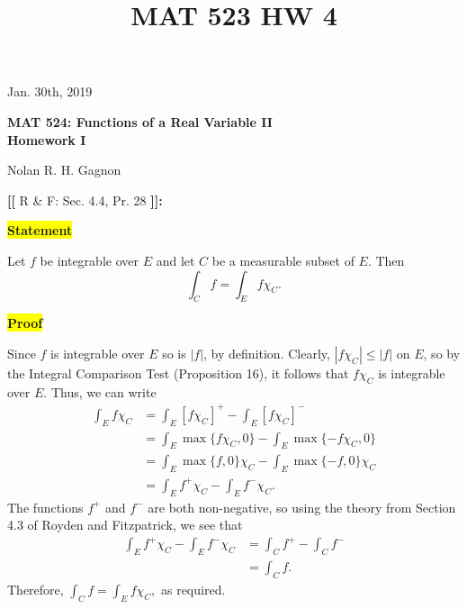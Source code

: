 \documentclass[12pt]{article}
\title{MAT 523 HW 4}
\newcommand{\mybox}{%
    \collectbox{%
        \setlength{\fboxsep}{2pt}%
        \fbox{\BOXCONTENT}%
    }%
}
\begin{document}
\hfill Jan. 30th, 2019
\begin{center}
\begin{large}
\textbf{MAT 524: Functions of a Real Variable II \\
\vspace{-5mm}
Homework I \\}
\end{large}
\vspace{-2mm}
Nolan R. H. Gagnon \\
\end{center}

\noindent \textbf{{\huge [}{\Large [}} R \& F: Sec. 4.4, Pr. 28 \textbf{{\Large ]}{\huge ]}}{\Large \textbf{:}}

\vspace{3mm}

\noindent\mybox{\colorbox{yellow}{\textbf{Statement}}}\hspace{3mm}\hrulefill

\noindent Let $f$ be integrable over $E$ and let $C$ be a measurable subset of $E$. Then $$\int_{C}f = \int_{E} f\chi_C.$$

\vspace{-2mm}

\noindent\mybox{\colorbox{yellow}{\textbf{Proof}}}\hspace{3mm}\hrulefill

\noindent Since $f$ is integrable over $E$ so is $|f|$, by definition. Clearly, $|f\chi_C|\leq |f|$ on $E$, so by the Integral Comparison Test (Proposition 16), it follows that $f\chi_C$ is integrable over $E$. Thus, we can write
\begin{align}
    \int_{E} f\chi_C &= \int_{E}\left[f\chi_C\right]^+ - \int_{E}\left[f\chi_C \right]^- \\
    &= \int_{E} \max\lbrace f\chi_C, 0\rbrace - \int_{E} \max\lbrace -f\chi_C, 0\rbrace \\
   &= \int_{E} \max\lbrace f, 0\rbrace\chi_C - \int_{E} \max\lbrace -f, 0\rbrace\chi_C \\
    &= \int_{E} f^+\chi_C - \int_{E} f^-\chi_C.
\end{align}
The functions $f^+$ and $f^-$ are both non-negative, so using the theory from Section 4.3 of Royden and Fitzpatrick, we see that
\begin{align}
    \int_{E} f^+\chi_C - \int_{E} f^-\chi_C &= \int_{C} f^+ - \int_{C} f^- \\
    &= \int_{C} f.
\end{align}
Therefore, $\int_C f = \int_E f\chi_C,$ as required.
\end{document}
